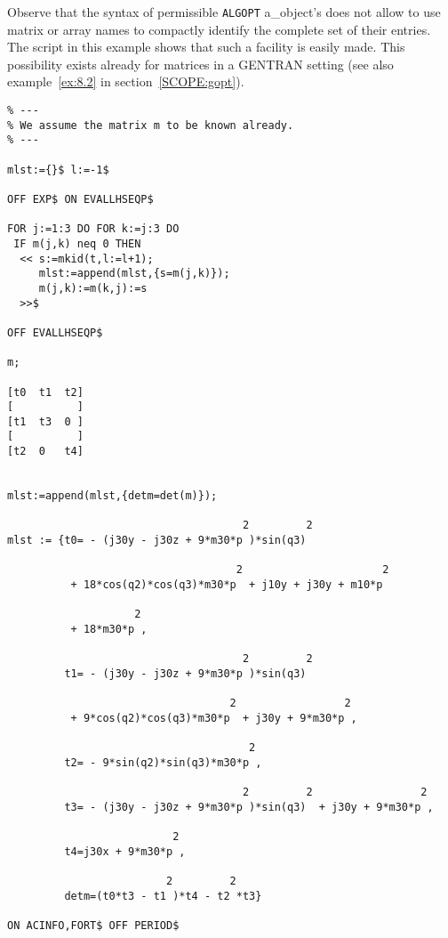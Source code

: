 Observe that the syntax of permissible {\tt ALGOPT} a\_object's does not
allow to use matrix or array names  to compactly identify the complete set
of their entries. The script in this example shows that such a facility is
easily made. This possibility exists already for matrices in a GENTRAN
setting (see also example~\ref{ex:8.2} in section~\ref{SCOPE:gopt}).
{\small
\begin{verbatim}
% ---
% We assume the matrix m to be known already.
% ---

mlst:={}$ l:=-1$

OFF EXP$ ON EVALLHSEQP$

FOR j:=1:3 DO FOR k:=j:3 DO
 IF m(j,k) neq 0 THEN
  << s:=mkid(t,l:=l+1);
     mlst:=append(mlst,{s=m(j,k)});
     m(j,k):=m(k,j):=s
  >>$

OFF EVALLHSEQP$

m;

[t0  t1  t2]
[          ]
[t1  t3  0 ]
[          ]
[t2  0   t4]


mlst:=append(mlst,{detm=det(m)});

                                     2         2
mlst := {t0= - (j30y - j30z + 9*m30*p )*sin(q3)

                                    2                      2
          + 18*cos(q2)*cos(q3)*m30*p  + j10y + j30y + m10*p

                    2
          + 18*m30*p ,

                                     2         2
         t1= - (j30y - j30z + 9*m30*p )*sin(q3)

                                   2                 2
          + 9*cos(q2)*cos(q3)*m30*p  + j30y + 9*m30*p ,

                                      2
         t2= - 9*sin(q2)*sin(q3)*m30*p ,

                                     2         2                 2
         t3= - (j30y - j30z + 9*m30*p )*sin(q3)  + j30y + 9*m30*p ,

                          2
         t4=j30x + 9*m30*p ,

                         2         2
         detm=(t0*t3 - t1 )*t4 - t2 *t3}

ON ACINFO,FORT$ OFF PERIOD$
\end{verbatim}}
